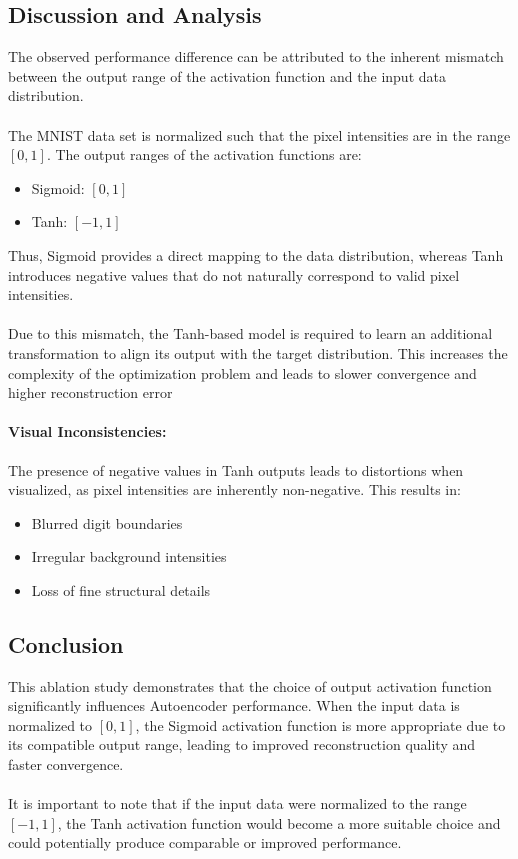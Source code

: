 \documentclass[12pt]{article}
\begin{document}
\subsection{Discussion and Analysis}

The observed performance difference can be attributed to the inherent mismatch between the output range of the activation function and the input data distribution.\\ \\The MNIST data set is normalized such that the pixel intensities are in the range $[0,1]$. The output ranges of the activation functions are:
\begin{itemize}
    \item Sigmoid: $[0,1]$
    \item Tanh: $[-1,1]$
\end{itemize}

Thus, Sigmoid provides a direct mapping to the data distribution, whereas Tanh introduces negative values that do not naturally correspond to valid pixel intensities.\\ \\Due to this mismatch, the Tanh-based model is required to learn an additional transformation to align its output with the target distribution. This increases the complexity of the optimization problem and leads to slower convergence and higher reconstruction error

\paragraph{Visual Inconsistencies:}
The presence of negative values in Tanh outputs leads to distortions when visualized, as pixel intensities are inherently non-negative. This results in:
\begin{itemize}
    \item Blurred digit boundaries
    \item Irregular background intensities
    \item Loss of fine structural details
\end{itemize}

\subsection{Conclusion}

This ablation study demonstrates that the choice of output activation function significantly influences Autoencoder performance. When the input data is normalized to $[0,1]$, the Sigmoid activation function is more appropriate due to its compatible output range, leading to improved reconstruction quality and faster convergence.\\ \\It is important to note that if the input data were normalized to the range $[-1,1]$, the Tanh activation function would become a more suitable choice and could potentially produce comparable or improved performance.
\end{document}
